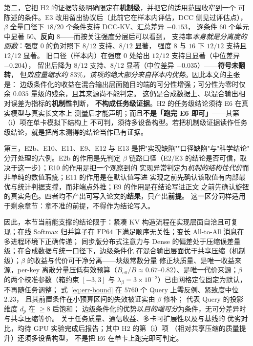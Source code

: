 第二，它把 H2 的证据等级明确限定在\textbf{机制级}，并把它的适用范围收窄到一个
可陈述的条件。E3 改用留出协议后（此前它在样本内评估，DCC 侧见过评估点），
$\beta$ 全量口径下 $18/20$ 个条件支持 DCC-KV、汇总差异 $-0.153$，
逐条件 $60$ 个单元中显著 $50$、\textbf{反向 $8$}——而按关注强度分层后可以看到，
支持率\emph{本身就是分离度的函数}：强度 $0$ 的负对照下 $8/12$ 支持、$8/12$ 显著，
强度 $8$ 与 $16$ 下 $12/12$ 支持且 $12/12$ 显著。
旧口径（样本内）在强度 $0$ 处给出 $12/12$ 支持且显著（中位差异 $-0.204$），
留出后降为 $8/12$ 支持、$8/12$ 显著（中位差异 $-0.035$）——\textbf{符号未翻转}，
但\emph{效应量缩水约 $83\%$，该项的绝大部分来自样本内优势}。因此本文的主张是：
边级条件化的收益在混合输出层面随目的端的可分性增强；可分性为零时仅余
$0.035$ 量级的残余，且其来源尚不能判定。
这仍是合成数据上、以混合输出相对误差为指标的\textbf{机制性}判断，
\textbf{不构成任务级证据}。H2 的任务级结论须待 E6 在真实模型与真实长文本上
测量后才能声明；而且\textbf{不是「跑完 E6 即可」}——其第（i）项在单卡模拟下结构上
不可判，须待多设备构型。若把机制级证据读作任务级结论，就是把尚未测得的结论当作已有证据。

第三，E2b、E10、E11、E9、E12 与 E13 是把"实现缺陷""口径缺陷"与"科学结论"
分开处理的六例。E2b 的作用是先判定
$\beta$ 链路口径（E2/E3 的结论是否可信，取决于这一步）；E10 的作用是把一个观察到的
实现异常判定为\emph{机制的结构性代价}而非单纯的数值瑕疵；E11 的作用是在默认值写进
实现之前先确认该取值有内部最优与统计判据支撑，而非端点外推；E9 的作用是在结论写进正文
之前先确认旋钮的真实角色。四者均不产出可写入论文的\textbf{结果}，只产出\textbf{前提}。
这一区分同样适用于剩余章节：拿不准的前提，不得作为结论写入。

因此，本节当前能支撑的结论限于：紧凑 KV 构造流程在实现层面自洽且可复现；在线 Softmax
归并算子在 $\mathrm{FP64}$ 下满足顺序无关性；变长 All-to-All 消息在多进程环境下正确传递；
同步版分布式注意力与 Dense 的偏差处于压缩误差量级；在合成数据与统一口径下，边级条件化
在混合输出层面优于共享压缩（机制级）；$\beta$ 的收益与代价可干净分离——块级常数分量
修正块质量、是唯一收益来源，per-key 离散分量压低有效预算（$B_{\text{eff}}/B\approx
0.67$--$0.82$）、是唯一代价来源；$\beta$ 的两个校准参数（箱约束 $[-3,3]$ 与
$\lambda_\beta=3\times10^{-2}$）已由网格定位固定为默认，不再随任务调整；
式~\eqref{eq:err-bound} 在 $5760$ 个 Query 上零反例、紧致度中位 $2.23$，
且其前置条件在小预算区间的失效被证实由 $\beta$ 修补；
代表 Query 的投影维度 $d_p$ 在 $\ge8$ 后饱和；
边级条件化的优势以\emph{目的端可分}为条件，无可分差异时与共享压缩等价。
关于任务质量、通信收益、多卡可扩展性以及与基线的
优劣对比，均待 GPU 实验完成后报告；其中 H2 的第（i）项
（相对共享压缩的质量提升）还须多设备构型，
不是把 E6 在单卡上跑完即可判定。
